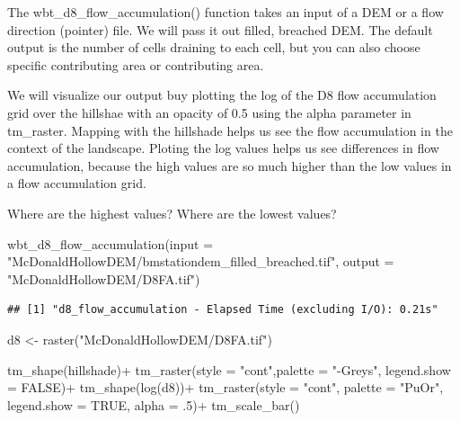 \documentclass[
]{book}
\newenvironment{Shaded}{\begin{snugshade}}{\end{snugshade}}
\newcommand{\AttributeTok}[1]{\textcolor[rgb]{0.77,0.63,0.00}{#1}}
\newcommand{\ConstantTok}[1]{\textcolor[rgb]{0.00,0.00,0.00}{#1}}
\newcommand{\DecValTok}[1]{\textcolor[rgb]{0.00,0.00,0.81}{#1}}
\newcommand{\FunctionTok}[1]{\textcolor[rgb]{0.00,0.00,0.00}{#1}}
\newcommand{\NormalTok}[1]{#1}
\newcommand{\OtherTok}[1]{\textcolor[rgb]{0.56,0.35,0.01}{#1}}
\newcommand{\SpecialCharTok}[1]{\textcolor[rgb]{0.00,0.00,0.00}{#1}}
\newcommand{\StringTok}[1]{\textcolor[rgb]{0.31,0.60,0.02}{#1}}
\begin{document}
The wbt\_d8\_flow\_accumulation() function takes an input of a DEM or a flow direction (pointer) file. We will pass it out filled, breached DEM. The default output is the number of cells draining to each cell, but you can also choose specific contributing area or contributing area.

We will visualize our output buy plotting the log of the D8 flow accumulation grid over the hillshae with an opacity of 0.5 using the alpha parameter in tm\_raster. Mapping with the hillshade helps us see the flow accumulation in the context of the landscape. Ploting the log values helps us see differences in flow accumulation, because the high values are so much higher than the low values in a flow accumulation grid.

Where are the highest values?
Where are the lowest values?

\begin{Shaded}
\begin{Highlighting}[]
\FunctionTok{wbt\_d8\_flow\_accumulation}\NormalTok{(}\AttributeTok{input =} \StringTok{"McDonaldHollowDEM/bmstationdem\_filled\_breached.tif"}\NormalTok{,}
                         \AttributeTok{output =} \StringTok{"McDonaldHollowDEM/D8FA.tif"}\NormalTok{)}
\end{Highlighting}
\end{Shaded}

\begin{verbatim}
## [1] "d8_flow_accumulation - Elapsed Time (excluding I/O): 0.21s"
\end{verbatim}

\begin{Shaded}
\begin{Highlighting}[]
\NormalTok{d8 }\OtherTok{\textless{}{-}} \FunctionTok{raster}\NormalTok{(}\StringTok{"McDonaldHollowDEM/D8FA.tif"}\NormalTok{)}

\FunctionTok{tm\_shape}\NormalTok{(hillshade)}\SpecialCharTok{+}
  \FunctionTok{tm\_raster}\NormalTok{(}\AttributeTok{style =} \StringTok{"cont"}\NormalTok{,}\AttributeTok{palette =} \StringTok{"{-}Greys"}\NormalTok{, }\AttributeTok{legend.show =} \ConstantTok{FALSE}\NormalTok{)}\SpecialCharTok{+}
\FunctionTok{tm\_shape}\NormalTok{(}\FunctionTok{log}\NormalTok{(d8))}\SpecialCharTok{+}
  \FunctionTok{tm\_raster}\NormalTok{(}\AttributeTok{style =} \StringTok{"cont"}\NormalTok{, }\AttributeTok{palette =} \StringTok{"PuOr"}\NormalTok{, }\AttributeTok{legend.show =} \ConstantTok{TRUE}\NormalTok{, }\AttributeTok{alpha =}\NormalTok{ .}\DecValTok{5}\NormalTok{)}\SpecialCharTok{+}
  \FunctionTok{tm\_scale\_bar}\NormalTok{()}
\end{Highlighting}
\end{Shaded}
\end{document}
